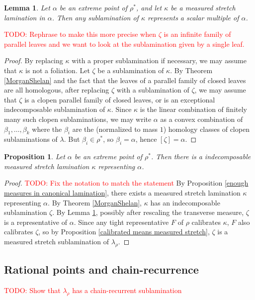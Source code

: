 \documentclass[reqno,11pt]{amsart}
\newtheorem{lemma}[theorem]{Lemma}
\newtheorem{proposition}[theorem]{Proposition}
\theoremstyle{definition}
\numberwithin{equation}{section}
\newcommand\todo[1]{\textcolor{red}{TODO: #1}}
\begin{document}
\begin{lemma}\label{extreme points are closed under sublaminations}
Let $\alpha$ be an extreme point of $\rho^*$, and let $\kappa$ be a measured stretch lamination in $\alpha$.
Then any sublamination of $\kappa$ represents a scalar multiple of $\alpha$.
\end{lemma}
\todo{Rephrase to make this more precise when $\zeta$ is an infinite family of parallel leaves and we want to look at the sublamination given by a single leaf.}
\begin{proof}
By replacing $\kappa$ with a proper sublamination if necessary, we may assume that $\kappa$ is not a foliation.
Let $\zeta$ be a sublamination of $\kappa$.
By Theorem \ref{MorganShelan} and the fact that the leaves of a parallel family of closed leaves are all homologous, after replacing $\zeta$ with a sublamination of $\zeta$, we may assume that $\zeta$ is a clopen parallel family of closed leaves, or is an exceptional indecomposable sublamination of $\kappa$.
Since $\kappa$ is the linear combination of finitely many such clopen sublaminations, we may write $\alpha$ as a convex combination of $\beta_1, \dots, \beta_k$ where the $\beta_i$ are the (normalized to mass $1$) homology classes of clopen sublaminations of $\lambda$.
But $\beta_i \in \rho^*$, so $\beta_i = \alpha$, hence $[\zeta] = \alpha$.
\end{proof}

\begin{proposition}\label{extreme points are indecomposable}
Let $\alpha$ be an extreme point of $\rho^*$.
Then there is a indecomposable measured stretch lamination $\kappa$ representing $\alpha$.
\end{proposition}
\begin{proof}
\todo{Fix the notation to match the statement} By Proposition \ref{enough measures in canonical lamination}, there exists a measured stretch lamination $\kappa$ representing $\alpha$.
By Theorem \ref{MorganShelan}, $\kappa$ has an indecomposable sublamination $\zeta$.
By Lemma \ref{extreme points are closed under sublaminations}, possibly after rescaling the transverse measure, $\zeta$ is a representative of $\alpha$.
Since any tight representative $F$ of $\rho$ calibrates $\kappa$, $F$ also calibrates $\zeta$, so by Proposition \ref{calibrated means measured stretch}, $\zeta$ is a measured stretch sublamination of $\lambda_\rho$.
\end{proof}

\subsection{Rational points and chain-recurrence}
\todo{Show that $\lambda_\rho$ has a chain-recurrent sublamination}
\end{document}
